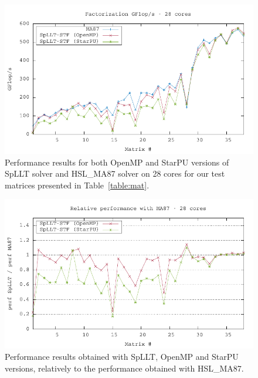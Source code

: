 \documentclass{article}
\newcommand{\starpu}{{StarPU}\xspace}
\newcommand{\openmp}{OpenMP\xspace}
\newcommand{\ma}{HSL\_MA87\xspace}
\begin{document}
\begin{table}[htbp]
    \begin{center}
      \texttt{ }
    \end{center}
    \caption{\label{table:exp-times}Factorization times (seconds) obtained with MA87 and
      SpLLT (i.e. MA87\_starpu). The factorizations were run with the
      block sizes \texttt{nb=(256, 384, 512, 768, 1024)} on 28 cores
      and \texttt{nemin=32}. The lowest factorization times are shown
      in bold.}
\end{table}


\begin{figure}[!h]
  \centering
  \includegraphics[width=\textwidth]{data/cmp_perf_stf}
  \caption{\label{fig:exp-perf} Performance results for both \openmp
    and \starpu versions of SpLLT solver and \ma solver on 28 cores
    for our test matrices presented in Table~\ref{table:mat}.}
\end{figure}

\begin{figure}[!h]
  \centering
  \includegraphics[width=\textwidth]{data/cmp_facto_rel_stf}
  \caption{\label{fig:exp-rel-perf}Performance results obtained with
    SpLLT, \openmp and \starpu versions, relatively to the performance
    obtained with \ma.}
\end{figure}
\end{document}

